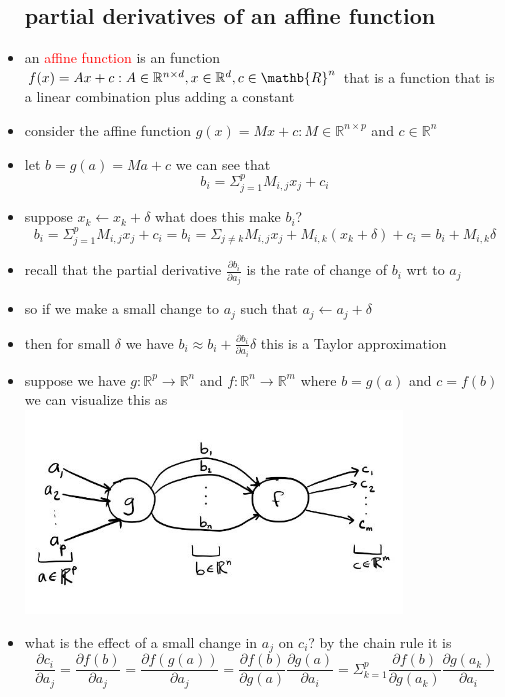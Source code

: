 \documentclass{article}
\begin{document}
\begin{itemize}
\subsection{partial derivatives of an affine function }
\item an \textcolor{red}{affine function} is an function $f(x)=Ax+c: A\in \mathbb{R}^{n\times d}, x\in \mathbb{R}^{d}, c\in \mathb{R}^{n}$ that is a function that is a linear combination plus adding a constant 
\item consider the affine function $g(x)=Mx+c: M\in \mathbb{R}^{n\times p}$ and $c\in \mathbb{R}^{n}$
\item let $b=g(a)=Ma+c$ we can see that $$b_i=\Sigma_{j=1}^{p}M_{i,j}x_{j}+c_{i}$$
\item suppose $x_k\leftarrow x_k+\delta$ what does this make $b_i$?
$$b_i=\Sigma_{j=1}^{p}M_{i,j}x_{j}+c_{i}=b_i=\Sigma_{j\neq k}M_{i,j}x_{j}+M_{i,k}(x_{k}+\delta)+c_{i}=b_i+M_{i,k}\delta$$
\item recall that the partial derivative $\frac{\partial b_i}{\partial a_j}$ is the rate of change of $b_i$ wrt to $a_j$ 
\item so if we make a small change to $a_j$ such that $a_j\leftarrow a_j+\delta$
\item then for small $\delta$ we have  $b_i\approx b_i+\frac{\partial b_i}{\partial a_i}\delta$ this is a Taylor approximation 
\item suppose we have $g:\mathbb{R}^{p}\rightarrow \mathbb{R}^{n}$ and $f:\mathbb{R}^{n}\rightarrow \mathbb{R}^{m}$ where $b=g(a)$ and $c=f(b)$ we can visualize this as \\ \includegraphics[width=10cm]{lecture_notes/lecture_11/immages/l11_12.JPG}
\item what is the effect of a small change in $a_j$ on $c_i$? by the chain rule it is $$\frac{\partial c_i}{\partial a_j}=\frac{\partial f(b)}{\partial a_j}=\frac{\partial f(g(a))}{\partial a_j}=\frac{\partial f(b)}{\partial g(a)}\frac{\partial g(a)}{\partial a_i}=\Sigma_{k=1}^{p}\frac{\partial f(b)}{\partial g(a_k)}\frac{\partial g(a_k)}{\partial a_i}$$

\end{itemize}
\end{document}
